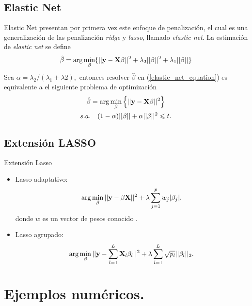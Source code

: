 \subsection{Elastic Net}
\begin{frame}{Elastic Net}
 \cite{elastic_net} presentan por primera vez este enfoque de penalización, el cual es una generalización de las penalización \textit{ridge} y \textit{lasso}, llamado \textit{elastic net}. La estimación de \textit{elastic net} se define 
\begin{align}\label{elastic_net_equation}
    \hat{\beta} = \arg \min_{\beta} \{||\mathbf{y}-\mathbf{X} \beta ||^2+\lambda_2||\beta||^2+\lambda_1||\beta||\}
\end{align} 
Sea $\alpha = \lambda_2/(\lambda_1+\lambda2),$ entonces resolver $\hat{\beta}$ en (\ref{elastic_net_equation}) es equivalente a el siguiente problema de optimización
\begin{align}
    \hat{\beta} &= \arg \min_{\beta} \left\{ ||\mathbf{y}-\mathbf{X}\beta||^2 \right\}\\
    s.a. &\ \ \ (1-\alpha)||\beta||+\alpha||\beta||^2\leqslant t.
\end{align}
\end{frame}

\subsection{Extensión LASSO}
\begin{frame}{Extensión Lasso}

\begin{itemize}
    \item Lasso adaptativo:
    \begin{align}
        \arg \min_{\beta} ||\mathbf{y}-\beta\mathbf{X}||^2+\lambda\sum_{j=1}^p w_j|\beta_j|. 
    \end{align}
    donde $w$ es un vector de pesos conocido \citep{elastic_net}.
    \item Lasso agrupado:
    \begin{align}
        \arg \min_{\beta} ||\mathbf{y}-\sum_{l=1}^L\mathbf{X}_l\beta_l||^2+\lambda\sum_{l=1}^L \sqrt{p_l}||\beta_l||_2. 
    \end{align}
    \citep{group_lasso}
\end{itemize}
 


\end{frame}

\section{Ejemplos numéricos.}
